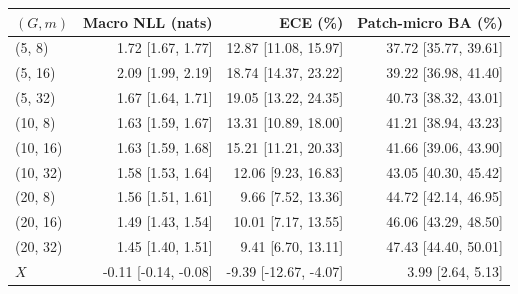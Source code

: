 \begin{tabular}{@{}lrrr@{}}
\toprule
$(G, m)$ & Macro NLL (nats) & ECE (\%) & Patch-micro BA (\%) \\
\midrule
(5, 8) & 1.72 [1.67, 1.77] & 12.87 [11.08, 15.97] & 37.72 [35.77, 39.61] \\
(5, 16) & 2.09 [1.99, 2.19] & 18.74 [14.37, 23.22] & 39.22 [36.98, 41.40] \\
(5, 32) & 1.67 [1.64, 1.71] & 19.05 [13.22, 24.35] & 40.73 [38.32, 43.01] \\
(10, 8) & 1.63 [1.59, 1.67] & 13.31 [10.89, 18.00] & 41.21 [38.94, 43.23] \\
(10, 16) & 1.63 [1.59, 1.68] & 15.21 [11.21, 20.33] & 41.66 [39.06, 43.90] \\
(10, 32) & 1.58 [1.53, 1.64] & 12.06 [9.23, 16.83] & 43.05 [40.30, 45.42] \\
(20, 8) & 1.56 [1.51, 1.61] & 9.66 [7.52, 13.36] & 44.72 [42.14, 46.95] \\
(20, 16) & 1.49 [1.43, 1.54] & 10.01 [7.17, 13.55] & 46.06 [43.29, 48.50] \\
(20, 32) & 1.45 [1.40, 1.51] & 9.41 [6.70, 13.11] & 47.43 [44.40, 50.01] \\
$X$ & -0.11 [-0.14, -0.08] & -9.39 [-12.67, -4.07] & 3.99 [2.64, 5.13] \\
\bottomrule
\end{tabular}
